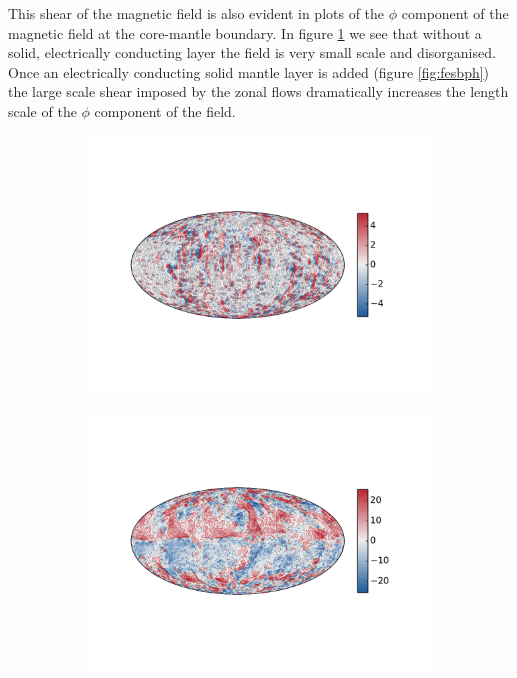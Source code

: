 This shear of the magnetic field is also evident in plots of the $\phi$ component of the magnetic field at the core-mantle boundary. In figure \ref{fig:nofesbph} we see that without a solid, electrically conducting layer the field is very small scale and disorganised. Once an electrically conducting solid mantle layer is added (figure \ref{fig:fesbph}) the large scale shear imposed by the zonal flows dramatically increases the length scale of the $\phi$ component of the field.
\begin{figure}
	\centering
	\begin{subfigure}{.8\textwidth}
		\centering
	        \includegraphics[width=\linewidth]{Chapter5/Figures/bph10_004_1800_100.pdf}
     		
		\caption{\label{fig:nofesbph}}
        \end{subfigure}
        
        \begin{subfigure}{.8\textwidth}
	        \centering
	        \includegraphics[width=\linewidth]{Chapter5/Figures/bph11_004_1631_100.pdf}
	       

\end{subfigure}
\end{figure}
